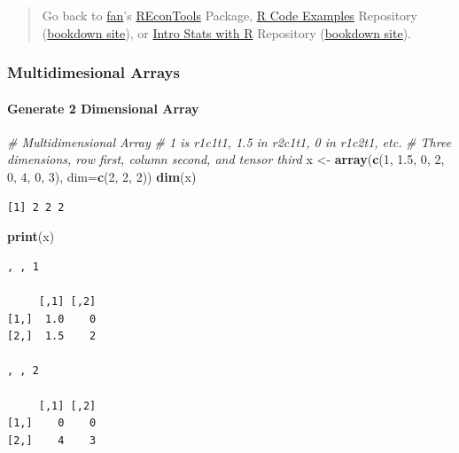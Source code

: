 \documentclass[
]{book}
\newenvironment{Shaded}{\begin{snugshade}}{\end{snugshade}}
\newcommand{\CommentTok}[1]{\textcolor[rgb]{0.56,0.35,0.01}{\textit{#1}}}
\newcommand{\DataTypeTok}[1]{\textcolor[rgb]{0.13,0.29,0.53}{#1}}
\newcommand{\DecValTok}[1]{\textcolor[rgb]{0.00,0.00,0.81}{#1}}
\newcommand{\FloatTok}[1]{\textcolor[rgb]{0.00,0.00,0.81}{#1}}
\newcommand{\KeywordTok}[1]{\textcolor[rgb]{0.13,0.29,0.53}{\textbf{#1}}}
\newcommand{\NormalTok}[1]{#1}
\newcommand{\StringTok}[1]{\textcolor[rgb]{0.31,0.60,0.02}{#1}}
\begin{document}
\begin{quote}
Go back to \href{http://fanwangecon.github.io/}{fan}'s \href{https://fanwangecon.github.io/REconTools/}{REconTools} Package, \href{https://fanwangecon.github.io/R4Econ/}{R Code Examples} Repository (\href{https://fanwangecon.github.io/R4Econ/bookdown}{bookdown site}), or \href{https://fanwangecon.github.io/Stat4Econ/}{Intro Stats with R} Repository (\href{https://fanwangecon.github.io/Stat4Econ/bookdown}{bookdown site}).
\end{quote}

\hypertarget{multidimesional-arrays}{%
\subsubsection{Multidimesional Arrays}\label{multidimesional-arrays}}

\hypertarget{generate-2-dimensional-array}{%
\paragraph{Generate 2 Dimensional Array}\label{generate-2-dimensional-array}}

\begin{Shaded}
\begin{Highlighting}[]
\CommentTok{# Multidimensional Array}
\CommentTok{# 1 is r1c1t1, 1.5 in r2c1t1, 0 in r1c2t1, etc.}
\CommentTok{# Three dimensions, row first, column second, and tensor third}
\NormalTok{x <-}\StringTok{ }\KeywordTok{array}\NormalTok{(}\KeywordTok{c}\NormalTok{(}\DecValTok{1}\NormalTok{, }\FloatTok{1.5}\NormalTok{, }\DecValTok{0}\NormalTok{, }\DecValTok{2}\NormalTok{, }\DecValTok{0}\NormalTok{, }\DecValTok{4}\NormalTok{, }\DecValTok{0}\NormalTok{, }\DecValTok{3}\NormalTok{), }\DataTypeTok{dim=}\KeywordTok{c}\NormalTok{(}\DecValTok{2}\NormalTok{, }\DecValTok{2}\NormalTok{, }\DecValTok{2}\NormalTok{))}
\KeywordTok{dim}\NormalTok{(x)}
\end{Highlighting}
\end{Shaded}

\begin{verbatim}
[1] 2 2 2
\end{verbatim}

\begin{Shaded}
\begin{Highlighting}[]
\KeywordTok{print}\NormalTok{(x)}
\end{Highlighting}
\end{Shaded}

\begin{verbatim}
, , 1

     [,1] [,2]
[1,]  1.0    0
[2,]  1.5    2

, , 2

     [,1] [,2]
[1,]    0    0
[2,]    4    3
\end{verbatim}
\end{document}
